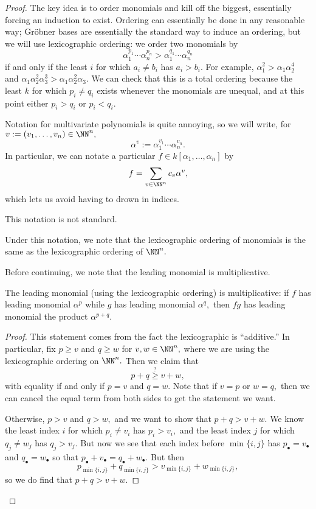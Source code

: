 \documentclass[../notes.tex]{subfiles}
\begin{document}
\begin{proof}
	The key idea is to order monomials and kill off the biggest, essentially forcing an induction to exist. Ordering can essentially be done in any reasonable way; Gr\"obner bases are essentially the standard way to induce an ordering, but we will use lexicographic ordering: we order two monomials by
	\[\alpha_1^{p_1}\cdots\alpha_n^{p_n}>\alpha_1^{q_1}\cdots\alpha_n^{q_n}\]
	if and only if the least $i$ for which $a_i\ne b_i$ has $a_i>b_i.$ For example, $\alpha_1^2>\alpha_1\alpha_2^4$ and $\alpha_1\alpha_2^2\alpha_3^3>\alpha_1\alpha_2^2\alpha_3.$ We can check that this is a total ordering because the least $k$ for which $p_i\ne q_i$ exists whenever the monomials are unequal, and at this point either $p_i>q_i$ or $p_i<q_i.$

	Notation for multivariate polynomials is quite annoying, so we will write, for $v:=(v_1,\ldots,v_n)\in\NN^n,$
	\[\alpha^v:=\alpha_1^{v_1}\cdots\alpha_n^{v_n}.\]
	In particular, we can notate a particular $f\in k[\alpha_1,\ldots,\alpha_n]$ by
	\[f=\sum_{v\in\NN^n}c_v\alpha^v,\]
	which lets us avoid having to drown in indices.
	\begin{warn}[Nir]
		This notation is not standard.
	\end{warn}
	Under this notation, we note that the lexicographic ordering of monomials is the same as the lexicographic ordering of $\NN^n.$
	
	Before continuing, we note that the leading monomial is multiplicative.
	\begin{lemma} \label{lem:multileadingcoef}
		The leading monomial (using the lexicographic ordering) is multiplicative: if $f$ has leading monomial $\alpha^p$ while $g$ has leading monomial $\alpha^q,$ then $fg$ has leading monomial the product $\alpha^{p+q}.$
	\end{lemma}
	\begin{proof}
		This statement comes from the fact the lexicographic is ``additive.'' In particular, fix $p\ge v$ and $q\ge w$ for $v,w\in\NN^n,$ where we are using the lexicographic ordering on $\NN^n.$ Then we claim that
		\[p+q\stackrel?\ge v+w,\]
		with equality if and only if $p=v$ and $q=w.$ Note that if $v=p$ or $w=q,$ then we can cancel the equal term from both sides to get the statement we want.
		
		Otherwise, $p>v$ and $q>w,$ and we want to show that $p+q>v+w.$ We know the least index $i$ for which $p_i\ne v_i$ has $p_i>v_i,$ and the least index $j$ for which $q_j\ne w_j$ has $q_j>v_j.$ But now we see that each index before $\min\{i,j\}$ has $p_\bullet=v_\bullet$ and $q_\bullet=w_\bullet$ so that $p_\bullet+v_\bullet=q_\bullet+w_\bullet.$ But then
		\[p_{\min\{i,j\}}+q_{\min\{i,j\}}>v_{\min\{i,j\}}+w_{\min\{i,j\}},\]
		so we do find that $p+q>v+w.$


\end{proof}
\end{proof}
\end{document}
